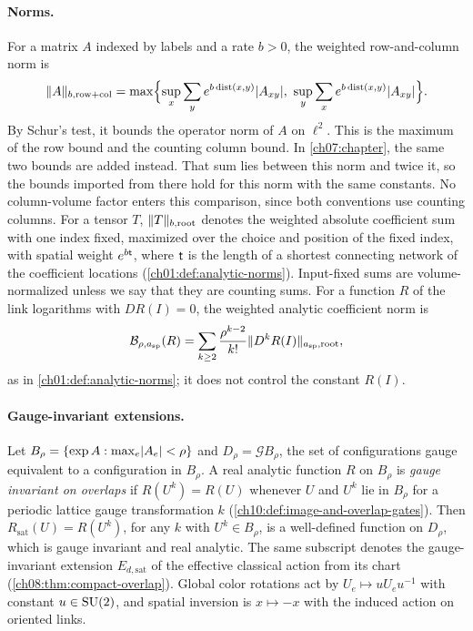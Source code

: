 \paragraph{Norms.}
For a matrix $A$ indexed by labels and a rate $b>0$, the weighted row-and-column norm is
\[
 \norm A_{b,\mathrm{row+col}}=\max\Bigl\{\sup_x\sum_ye^{b\dist(x,y)}\abs{A_{xy}},\ \sup_y\sum_xe^{b\dist(x,y)}\abs{A_{xy}}\Bigr\}.
\]
By Schur's test, it bounds the operator norm of $A$ on $\ell^2$. This is the maximum of the row bound and the counting column bound. In \cref{ch07:chapter}, the same two bounds are added instead. That sum lies between this norm and twice it, so the bounds imported from there hold for this norm with the same constants. No column-volume factor enters this comparison, since both conventions use counting columns. For a tensor $T$, $\lVert T\rVert_{b,\mathrm{root}}$ denotes the weighted absolute coefficient sum with one index fixed, maximized over the choice and position of the fixed index, with spatial weight $e^{b\mathsf t}$, where $\mathsf t$ is the length of a shortest connecting network of the coefficient locations (\cref{ch01:def:analytic-norms}). Input-fixed sums are volume-normalized unless we say that they are counting sums. For a function $R$ of the link logarithms with $DR(I)=0$, the weighted analytic coefficient norm is
\[
 \mathcal B_{\rho,a_{\mathrm{sp}}}(R)=\sum_{k\ge2}\frac{\rho^{k-2}}{k!}\lVert D^kR(I)\rVert_{a_{\mathrm{sp}},\mathrm{root}},
\]
as in \cref{ch01:def:analytic-norms}; it does not control the constant $R(I)$.

\paragraph{Gauge-invariant extensions.}
Let $B_\rho=\{\exp A:\max_e\lvert A_e\rvert<\rho\}$ and $D_\rho=\mathcal GB_\rho$, the set of configurations gauge equivalent to a configuration in $B_\rho$. A real analytic function $R$ on $B_\rho$ is \emph{gauge invariant on overlaps} if $R(U^k)=R(U)$ whenever $U$ and $U^k$ lie in $B_\rho$ for a periodic lattice gauge transformation $k$ (\cref{ch10:def:image-and-overlap-gates}). Then $R_{\mathrm{sat}}(U)=R(U^k)$, for any $k$ with $U^k\in B_\rho$, is a well-defined function on $D_\rho$, which is gauge invariant and real analytic. The same subscript denotes the gauge-invariant extension $E_{d,\mathrm{sat}}$ of the effective classical action from its chart (\cref{ch08:thm:compact-overlap}). Global color rotations act by $U_e\mapsto uU_eu^{-1}$ with constant $u\in\mathrm{SU}(2)$, and spatial inversion is $x\mapsto-x$ with the induced action on oriented links.

